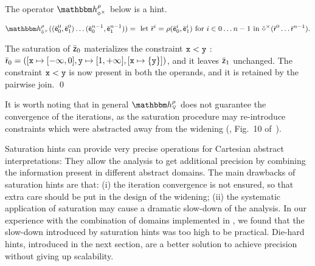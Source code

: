 \documentclass{llncs}
\begin{document}
\begin{lemma}
The operator $\hint{\op^\times}^{\rho}$ below is a hint.
\begin{small}
  \[
    \hint{\ael{\op}^\times}^{\rho}((\ael{e}^0_0, \ael{e}^0_1) \dots
    (\ael{e}^{n-1}_0, \ael{e}^{n-1}_1)) = \   \mathrm{let}\ \ael{r}^i
    = \rho(\ael{e}_0^i, \ael{e}_1^i)\ \mathrm{for}\ i \in 0 \dots n-1\ 
 \mathrm{in}\ \ael{\op}^\times(\ael{r}^0 \dots \ael{r}^{n-1}).
 \]
\end{small}
\end{lemma}


\begin{example}
The saturation of $\bar{\mathsf{\mathsf{z}}}_0$ materializes the constraint $\mathtt{x} < \mathtt{y}$ : $\bar{\mathsf{\mathsf{r}}}_0 = ([\mathtt{x} \mapsto [-\infty, 0], \mathtt{y} \mapsto [1, +\infty],  [\mathtt{x} \mapsto \{ \mathtt{y}\}] )$, and it leaves $\bar{\mathsf{\mathsf{z}}}_1$ unchanged.
The constraint $\mathtt{x} < \mathtt{y}$ is now  present in both the operands, and it is retained by the pairwise join. \qed
\end{example}

It is worth noting that in general $\hint{\widening}^{\rho}$ does not
guarantee the convergence of the iterations, as the saturation
procedure may re-introduce constraints which were abstracted away from
the widening (\eg, Fig.~10 of~\cite{Mine01-2}).

Saturation hints can provide very precise operations for Cartesian abstract interpretations:
They allow the analysis to get additional precision by combining the information present in different abstract domains.
The main drawbacks of saturation hints are that: (i) the iteration convergence is not ensured, so that extra care should be put in the design of the widening; (ii) the systematic application of saturation may cause a dramatic slow-down of the  analysis.
In our experience with the combination of domains implemented in \Clousot, we found that the slow-down introduced by saturation hints was too high to be practical.
Die-hard hints, introduced in the next section, are a better solution to achieve precision without giving up scalability.
\end{document}
